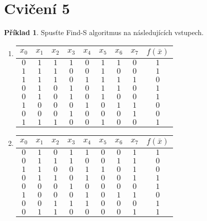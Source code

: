 \documentclass[a4paper]{article}
\theoremstyle{definition}
\newtheorem{priklad}{Příklad}
\begin{document}
\section*{Cvičení 5}
\setcounter{priklad}{0}
\begin{priklad}
    Spusťte Find-S algoritmus na následujících vstupech.
    
    \begin{enumerate}
      \item 
          \begin{tabular}{*{8}{c}|c}
          \hline
           $ x_0 $ & $ x_1 $ & $ x_2 $ & $ x_3 $ & $ x_4 $ & $ x_5 $ & $ x_6 $ & $ x_7 $ & $ f(\bar{x}) $ \\
           \hline
           $ 0 $ & $ 1 $ & $ 1 $ & $ 1 $ & $ 0 $ & $ 1 $ & $ 1 $ & $ 0 $ & $ 1 $ \\
           $ 1 $ & $ 1 $ & $ 1 $ & $ 0 $ & $ 0 $ & $ 1 $ & $ 0 $ & $ 0 $ & $ 1 $ \\
           $ 1 $ & $ 1 $ & $ 1 $ & $ 0 $ & $ 1 $ & $ 1 $ & $ 1 $ & $ 1 $ & $ 0 $ \\
           $ 0 $ & $ 1 $ & $ 0 $ & $ 1 $ & $ 0 $ & $ 1 $ & $ 1 $ & $ 0 $ & $ 1 $ \\
           $ 0 $ & $ 1 $ & $ 0 $ & $ 1 $ & $ 0 $ & $ 1 $ & $ 0 $ & $ 0 $ & $ 1 $ \\
           $ 1 $ & $ 0 $ & $ 0 $ & $ 0 $ & $ 1 $ & $ 0 $ & $ 1 $ & $ 1 $ & $ 0 $ \\
           $ 0 $ & $ 0 $ & $ 0 $ & $ 1 $ & $ 0 $ & $ 0 $ & $ 0 $ & $ 1 $ & $ 0 $ \\
           $ 1 $ & $ 1 $ & $ 1 $ & $ 0 $ & $ 0 $ & $ 1 $ & $ 0 $ & $ 0 $ & $ 1 $ \\
           \hline
          \end{tabular}
      \item 
          \begin{tabular}{*{8}{c}|c}
          \hline
           $ x_0 $ & $ x_1 $ & $ x_2 $ & $ x_3 $ & $ x_4 $ & $ x_5 $ & $ x_6 $ & $ x_7 $ & $ f(\bar{x}) $ \\
           \hline
           $ 0 $ & $ 1 $ & $ 0 $ & $ 1 $ & $ 1 $ & $ 0 $ & $ 0 $ & $ 1 $ & $ 1 $ \\
           $ 0 $ & $ 1 $ & $ 1 $ & $ 1 $ & $ 0 $ & $ 0 $ & $ 1 $ & $ 1 $ & $ 0 $ \\
           $ 1 $ & $ 1 $ & $ 0 $ & $ 0 $ & $ 1 $ & $ 1 $ & $ 0 $ & $ 1 $ & $ 0 $ \\
           $ 0 $ & $ 1 $ & $ 1 $ & $ 0 $ & $ 1 $ & $ 0 $ & $ 0 $ & $ 1 $ & $ 1 $ \\
           $ 0 $ & $ 0 $ & $ 0 $ & $ 1 $ & $ 0 $ & $ 0 $ & $ 0 $ & $ 0 $ & $ 1 $ \\
           $ 1 $ & $ 0 $ & $ 0 $ & $ 0 $ & $ 1 $ & $ 0 $ & $ 1 $ & $ 1 $ & $ 0 $ \\
           $ 0 $ & $ 0 $ & $ 1 $ & $ 1 $ & $ 1 $ & $ 0 $ & $ 0 $ & $ 0 $ & $ 1 $ \\
           $ 0 $ & $ 1 $ & $ 1 $ & $ 0 $ & $ 0 $ & $ 0 $ & $ 0 $ & $ 1 $ & $ 1 $ \\
           \hline
          \end{tabular}
    \end{enumerate}
    

\end{priklad}
\end{document}
